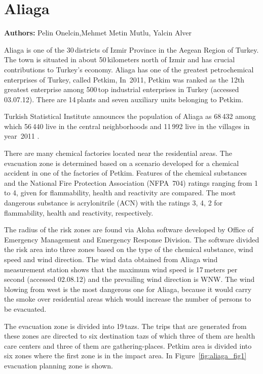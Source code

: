 \chapter{Aliaga}
\label{ch:aliaga}
\hfill \textbf{Authors:} Pelin Onelcin,Mehmet Metin Mutlu, Yalcin Alver

Aliaga is one of the 30\,districts of Izmir Province in the Aegean Region of Turkey. 
The town is situated in about 50\,kilometers north of Izmir and has crucial contributions to Turkey’s economy. 
Aliaga has one of the greatest petrochemical enterprises of Turkey, called Petkim, In~2011, Petkim was ranked as the 12th greatest enterprise among 500\,top industrial enterprises in Turkey \citep[][]{ICI_Webpage_2012}(accessed 03.07.12). There are 14\,plants and seven auxiliary units belonging to Petkim. 

Turkish Statistical Institute announces the population of Aliaga as 68\,432 among which 56\,440 live in the central neighborhoods and 11\,992 live in the villages in year~2011 \citep[][]{TSI_Webpage_2011}.

There are many chemical factories located near the residential areas. The evacuation zone is determined based on a scenario developed for a chemical accident in one of the factories of Petkim. Features of the chemical substances and the National Fire Protection Association (NFPA~704) ratings ranging from 1 to 4, given for flammability, health and reactivity are compared. The most dangerous substance is acrylonitrile (ACN) with the ratings 3, 4, 2 for flammability, health and reactivity, respectively.

The radius of the risk zones are found via Aloha software developed by Office of Emergency Management and Emergency Response Division. The software divided the risk area into three zones based on the type of the chemical substance, wind speed and wind direction. The wind data obtained from Aliaga wind measurement station shows that the maximum wind speed is 17\,meters per second \citep[][]{Wolfram_Webpage_2012}(accessed 02.08.12) and the prevailing wind direction is WNW. The wind blowing from west is the most dangerous one for Aliaga, because it would carry the smoke over residential areas which would increase the number of persons to be evacuated.

The evacuation zone is divided into 19\,\glspl{taz}. The trips that are generated from these zones are directed to six destination \glspl{taz} of which three of them are health care centers and three of them are gathering-places. Petkim area is divided into six zones where the first zone is in the impact area. In Figure~\ref{fig:aliaga_fig1} evacuation planning zone is shown.

